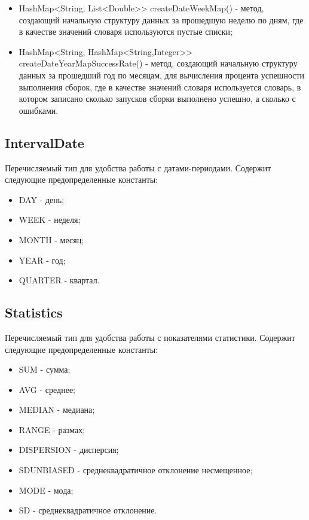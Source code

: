 \begin{itemize}
	\item HashMap<String, List<Double>> createDateWeekMap() - метод, создающий начальную структуру данных за прошедшую неделю по дням, где в качестве значений словаря используются пустые списки;
	\item HashMap<String, HashMap<String,Integer>> createDateYearMapSuccessRate() - метод, создающий начальную структуру данных за прошедший год по месяцам, для вычисления процента успешности выполнения сборок, где в качестве значений словаря используется словарь, в котором записано сколько запусков сборки выполнено успешно, а сколько с ошибками.
\end{itemize}
	
	\subsection{IntervalDate}
	
	Перечисляемый тип для удобства работы с датами-периодами. Содержит следующие предопределенные константы:
	
	\begin{itemize}
	\item DAY - день;
	\item WEEK - неделя;
	\item MONTH - месяц;
	\item YEAR - год;
	\item QUARTER - квартал.
\end{itemize}

	\subsection{Statistics}
	
	Перечисляемый тип для удобства работы с показателями статистики. Содержит следующие предопределенные константы:
	
	\begin{itemize}
	\item SUM - сумма;
	\item AVG - среднее;
	\item MEDIAN - медиана;
	\item RANGE - размах;
	\item DISPERSION - дисперсия;
	\item SDUNBIASED - среднеквадратичное отклонение несмещенное;
	\item MODE - мода;
	\item SD - среднеквадратичное отклонение.
\end{itemize}


